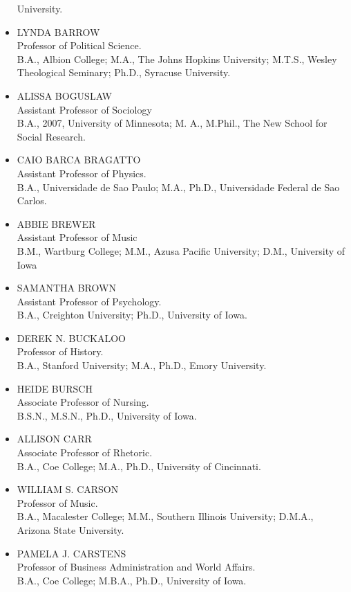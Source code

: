 \documentclass[
  letterpaper,
]{scrbook}
\begin{document}
\begin{itemize}
  University.
\item
  LYNDA BARROW\\
  Professor of Political Science.\\
  B.A., Albion College; M.A., The Johns Hopkins University; M.T.S.,
  Wesley Theological Seminary; Ph.D., Syracuse University.
\item
  ALISSA BOGUSLAW\\
  Assistant Professor of Sociology\\
  B.A., 2007, University of Minnesota; M. A., M.Phil., The New School
  for Social Research.
\item
  CAIO BARCA BRAGATTO\\
  Assistant Professor of Physics.\\
  B.A., Universidade de Sao Paulo; M.A., Ph.D., Universidade Federal de
  Sao Carlos.
\item
  ABBIE BREWER\\
  Assistant Professor of Music\\
  B.M., Wartburg College; M.M., Azusa Pacific University; D.M.,
  University of Iowa
\item
  SAMANTHA BROWN\\
  Assistant Professor of Psychology.\\
  B.A., Creighton University; Ph.D., University of Iowa.
\item
  DEREK N. BUCKALOO\\
  Professor of History.\\
  B.A., Stanford University; M.A., Ph.D., Emory University.
\item
  HEIDE BURSCH\\
  Associate Professor of Nursing.\\
  B.S.N., M.S.N., Ph.D., University of Iowa.
\item
  ALLISON CARR\\
  Associate Professor of Rhetoric.\\
  B.A., Coe College; M.A., Ph.D., University of Cincinnati.
\item
  WILLIAM S. CARSON\\
  Professor of Music.\\
  B.A., Macalester College; M.M., Southern Illinois University; D.M.A.,
  Arizona State University.
\item
  PAMELA J. CARSTENS\\
  Professor of Business Administration and World Affairs.\\
  B.A., Coe College; M.B.A., Ph.D., University of Iowa.

\end{itemize}
\end{document}
